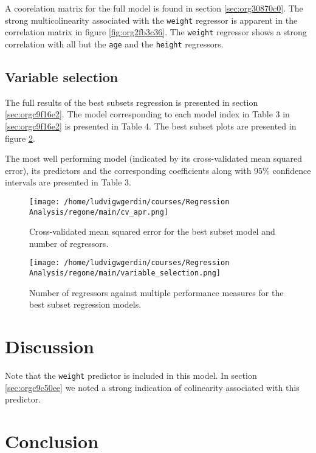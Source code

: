 \documentclass[11pt]{article}
\begin{document}
A coorelation matrix for the full model is found in section \ref{sec:org30870c0}. The strong multicolinearity
associated with the \texttt{weight} regressor is apparent in the correlation matrix in figure
\ref{fig:org2fb3c36}. The \texttt{weight} regressor shows a strong correlation with all but the \texttt{age} and
the \texttt{height} regressors.

 

\subsection{Variable selection}
\label{sec:org992b622}

The full results of the best subsets regression is presented in section \ref{sec:orgc9f16e2}. The model corresponding
to each model index in Table 3 in \ref{sec:orgc9f16e2} is presented in Table 4. The best subset plots 
are presented in figure \ref{fig:orga44f818}.

The most well performing model (indicated by its cross-validated mean squared error), its predictors and
the corresponding coefficients along with 95\% confidence intervals are presented in Table 3. 

\begin{figure}[htbp]
\centering
\texttt{[image: /home/ludvigwgerdin/courses/Regression Analysis/regone/main/cv\_apr.png]}
\caption{\label{fig:org9547aab}
Cross-validated mean squared error for the best subset model and number of regressors.}
\end{figure}

\begin{figure}[htbp]
\centering
\texttt{[image: /home/ludvigwgerdin/courses/Regression Analysis/regone/main/variable\_selection.png]}
\caption{\label{fig:orga44f818}
Number of regressors against multiple performance measures for the best subset regression models.}
\end{figure}


\newpage
\section{Discussion}
\label{sec:orga19bace}
Note that the \texttt{weight} predictor is included in this model. In section \ref{sec:orgc9c50ee}
we noted a strong indication of colinearity associated with this predictor.
\section{Conclusion}
\label{sec:org02ccb95}
\end{document}
